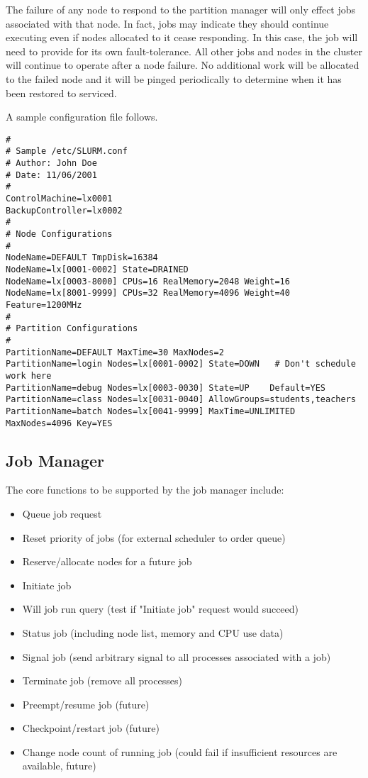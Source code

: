 The failure of any node to respond to the partition manager will only 
effect jobs associated with that node. 
In fact, jobs may indicate they should continue executing even if nodes 
allocated to it cease responding. 
In this case, the job will need to provide for its own fault-tolerance.
All other jobs and nodes in the cluster will continue to operate after 
a node failure. 
No additional work will be allocated to the failed node and it will 
be pinged periodically to determine when it has been restored to serviced.

A sample configuration file follows.

\begin{verbatim}
# 
# Sample /etc/SLURM.conf
# Author: John Doe
# Date: 11/06/2001
#
ControlMachine=lx0001
BackupController=lx0002
#
# Node Configurations
#
NodeName=DEFAULT TmpDisk=16384
NodeName=lx[0001-0002] State=DRAINED
NodeName=lx[0003-8000] CPUs=16 RealMemory=2048 Weight=16
NodeName=lx[8001-9999] CPUs=32 RealMemory=4096 Weight=40 Feature=1200MHz
#
# Partition Configurations
#
PartitionName=DEFAULT MaxTime=30 MaxNodes=2
PartitionName=login Nodes=lx[0001-0002] State=DOWN   # Don't schedule work here
PartitionName=debug Nodes=lx[0003-0030] State=UP    Default=YES
PartitionName=class Nodes=lx[0031-0040] AllowGroups=students,teachers
PartitionName=batch Nodes=lx[0041-9999] MaxTime=UNLIMITED MaxNodes=4096 Key=YES
\end{verbatim}

\subsection{Job Manager}

The core functions to be supported by the job manager include:
\begin{itemize}
\item Queue job request
\item Reset priority of jobs (for external scheduler to order queue)
\item Reserve/allocate nodes for a future job
\item Initiate job
\item Will job run query (test if "Initiate job" request would succeed)
\item Status job (including node list, memory and CPU use data)
\item Signal job (send arbitrary signal to all processes associated with a job)
\item Terminate job (remove all processes)
\item Preempt/resume job  (future)
\item Checkpoint/restart job (future)
\item Change node count of running job (could fail if insufficient resources are 
available, future)
\end{itemize}

